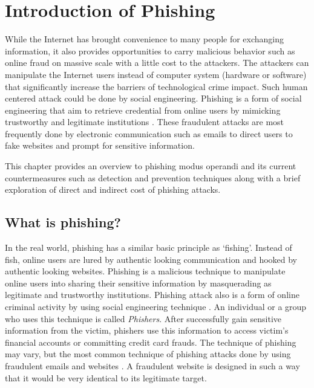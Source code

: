 
\chapter{Introduction of Phishing}

While the Internet has brought convenience to many people for exchanging
information, it also provides opportunities to carry malicious behavior
such as online fraud on massive scale with a little cost to the attackers.
The attackers can manipulate the Internet users instead of computer
system (hardware or software) that significantly increase the barriers
of technological crime impact. Such human centered attack could be
done by social engineering. Phishing is a form of social engineering
that aim to retrieve credential from online users by mimicking trustworthy
and legitimate institutions \citep{jakobsson:2006}. These fraudulent
attacks are most frequently done by electronic communication such
as emails to direct users to fake websites and prompt for sensitive
information.

This chapter provides an overview to phishing modus operandi and its
current countermeasures such as detection and prevention techniques
along with a brief exploration of direct and indirect cost of phishing
attacks.


\section{What is phishing?}

In the real world, phishing has a similar basic principle as \textquoteleft fishing\textquoteright .
Instead of fish, online users are lured by authentic looking communication
and hooked by authentic looking websites. Phishing is a malicious
technique to manipulate online users into sharing their sensitive
information by masquerading as legitimate and trustworthy institutions.
Phishing attack also is a form of online criminal activity by using
social engineering technique \citep{jakobsson:2006}. An individual
or a group who uses this technique is called \emph{Phishers}. After
successfully gain sensitive information from the victim, phishers
use this information to access victim\textquoteright s financial accounts
or committing credit card frauds. The technique of phishing may vary,
but the most common technique of phishing attacks done by using fraudulent
emails and websites \citep{james:2005}. A fraudulent website is designed
in such a way that it would be very identical to its legitimate target.


